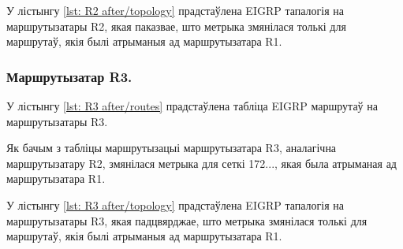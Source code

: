 


У лістынгу \ref{lst: R2 after/topology} прадстаўлена EIGRP тапалогія
на маршрутызатары R2, якая паказвае, што метрыка змянілася толькі
для маршрутаў, якія былі атрыманыя ад маршрутызатара R1.



\subsubsection{Маршрутызатар R3.}

У лістынгу \ref{lst: R3 after/routes} прадстаўлена табліца EIGRP маршрутаў на маршрутызатары R3.



Як бачым з табліцы маршрутызацыі маршрутызатара R3, аналагічна маршрутызатару R2, змянілася метрыка
для сеткі 172..., якая была атрыманая ад маршрутызатара R1.

У лістынгу \ref{lst: R3 after/topology} прадстаўлена EIGRP тапалогія
на маршрутызатары R3, якая падцвярджае, што метрыка змянілася толькі
для маршрутаў, якія былі атрыманыя ад маршрутызатара R1.


